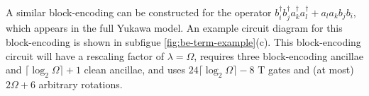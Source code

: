 A similar block-encoding can be constructed for the operator $b_i^\dagger b_j^\dagger a_k^\dagger a_l^\dagger + a_l a_k b_j b_i$, which appears in the full Yukawa model.
An example circuit diagram for this block-encoding is shown in subfigue \ref{fig:be-term-example}(c).
This block-encoding circuit will have a rescaling factor of $\lambda = \Omega$, requires three block-encoding ancillae and $\lceil \log_2\Omega \rceil + 1$ clean ancillae, and uses $24 \lceil \log_2\Omega \rceil - 8$ T gates and (at most) $2\Omega + 6$ arbitrary rotations.

